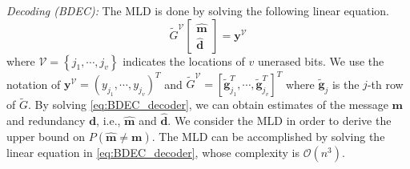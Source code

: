 \documentclass[10pt,twocolumn,twoside,submit]{JCNtran}
\begin{document}
	\emph{Decoding (BDEC):} The MLD is done by solving the following linear equation.
	\begin{equation}\label{eq:BDEC_decoder}
		\widetilde{G}^{\mathcal{V}} \begin{bmatrix} \widehat{\mathbf{m}} \\ \widehat{\mathbf{d}} \end{bmatrix} = {\mathbf{y}}^{\mathcal{V}}
	\end{equation}
	where ${\mathcal{V}}=\left\{j_1,\cdots, j_v\right\}$ indicates the locations of $v$ unerased bits. We use the notation of ${\mathbf{y}}^{\mathcal{V}}=\left(y_{j_1}, \cdots, y_{j_v}\right)^T$ and $\widetilde{G}^{\mathcal{V}}=\left[ \widetilde{\mathbf{g}}_{j_1}^T, \cdots, \widetilde{\mathbf{g}}_{j_v}^T \right]^T$ where $\widetilde{\mathbf{g}}_j$ is the $j$-th row of $\widetilde{G}$. By solving \eqref{eq:BDEC_decoder}, we can obtain estimates of the message $\mathbf{m}$ and redundancy $\mathbf{d}$, i.e., $\widehat{\mathbf{m}}$ and $\widehat{\mathbf{d}}$. We consider the MLD in order to derive the upper bound on $P\left( \widehat{\mathbf{m}} \ne \mathbf{m} \right)$. The MLD can be accomplished by solving the linear equation in \eqref{eq:BDEC_decoder}, whose complexity is ${\mathcal{O}}\left(n^3\right)$. %
	
	
	
\end{document}
